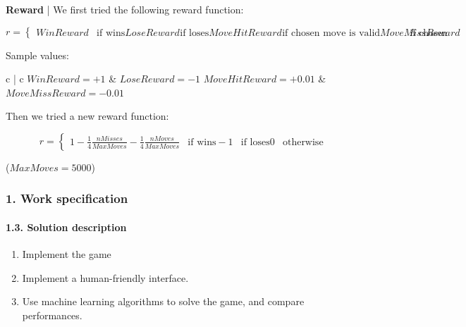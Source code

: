 \documentclass{beamer}
\def\\{}
\begin{document}
\begin{frame}

\textbf{Reward} | We first tried the following reward function:

\begin{equation*}
  r = \begin{cases}
    WinReward & \text{if wins} \\
    LoseReward & \text{if loses} \\
    MoveHitReward & \text{if chosen move is valid} \\
    MoveMissReward & \text{if chosen move is invalid}
  \end{cases}
\end{equation*}

Sample values:
\begin{center}
  \footnotesize
  \begin{tabular}{c | c}
    $WinReward = +1$ & $LoseReward=-1$ \\ \hline
    $MoveHitReward = +0.01$ & $MoveMissReward = -0.01$
  \end{tabular}
\end{center}

Then we tried a new reward function:

\begin{equation*}
  r = \begin{cases}
    1 - \frac{1}{4}\frac{nMisses}{MaxMoves} - \frac{1}{4} \frac{nMoves}{MaxMoves} & \text{if wins} \\
    -1 & \text{if loses} \\
    0 & \text{otherwise}
  \end{cases}
\end{equation*}

($MaxMoves = 5000$)

\end{frame}

\begin{frame}
\frametitle{1. Work specification}
\framesubtitle{1.3. Solution description}

\begin{enumerate}
  \itemsep0em
  \item Implement the game
  \item Implement a human-friendly interface.
  \item Use machine learning algorithms to solve the game, and compare performances.
\end{enumerate}

\end{frame}
\end{document}
